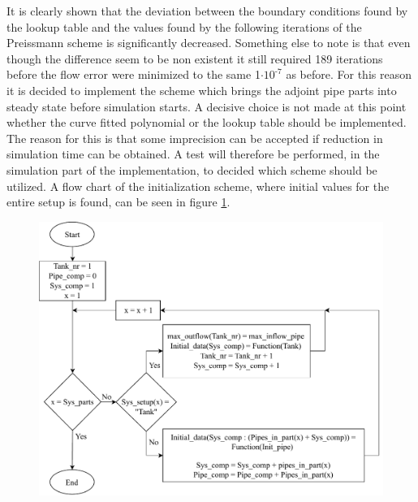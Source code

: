 It is clearly shown that the deviation between the boundary conditions found by the lookup table and the values found by the following iterations of the Preissmann scheme is significantly decreased.
Something else to note is that even though the difference seem to be non existent it still required 189 iterations before the flow error were minimized to the same 1$\cdot \text{10}^{\text{-7}}$ as before. For this reason it is decided to implement the scheme which brings the adjoint pipe parts into steady state before simulation starts. A decisive choice is not made at this point whether the curve fitted polynomial or the lookup table should be implemented. The reason for this is that some imprecision can be accepted if reduction in simulation time can be obtained. A test will therefore be performed, in the simulation part of the implementation, to decided which scheme should be utilized. A flow chart of the initialization scheme, where initial values for the entire setup is found, can be seen in figure \ref{fig:init_sys_dia}.

\begin{figure}[H]
\centering
\includegraphics[width=1.05 \textwidth]{report/simulation/pictures/init_sys_dia.pdf}
\caption{}
\label{fig:init_sys_dia}
\end{figure}

